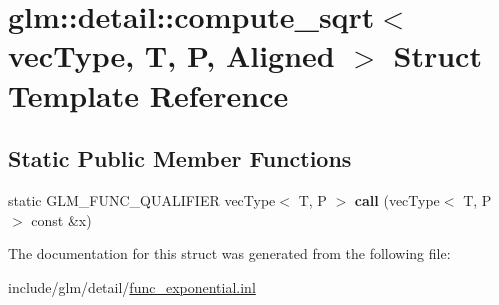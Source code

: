\hypertarget{structglm_1_1detail_1_1compute__sqrt}{}\section{glm\+:\+:detail\+:\+:compute\+\_\+sqrt$<$ vec\+Type, T, P, Aligned $>$ Struct Template Reference}
\label{structglm_1_1detail_1_1compute__sqrt}
\subsection*{Static Public Member Functions}
\begin{DoxyCompactItemize}
\item 
\mbox{\label{structglm_1_1detail_1_1compute__sqrt_ae58351e6ea836486d1724511c9f5edd1}} 
static G\+L\+M\+\_\+\+F\+U\+N\+C\+\_\+\+Q\+U\+A\+L\+I\+F\+I\+ER vec\+Type$<$ T, P $>$ {\bfseries call} (vec\+Type$<$ T, P $>$ const \&x)
\end{DoxyCompactItemize}


The documentation for this struct was generated from the following file\+:\begin{DoxyCompactItemize}
\item 
include/glm/detail/\hyperlink{func__exponential_8inl}{func\+\_\+exponential.\+inl}\end{DoxyCompactItemize}
